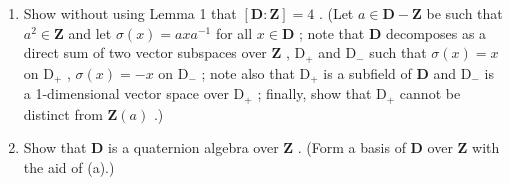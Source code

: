 \begin{enumerate}
\def\labelenumi{(\alph{enumi})}
\item
  Show without using Lemma 1 that \([\mathbf{D}:\mathbf{Z}] = 4\) . (Let \(a\in \mathbf{D} - \mathbf{Z}\) be such that \(a^2\in \mathbf{Z}\) and let \(\sigma (x) = axa^{-1}\) for all \(x\in \mathbf{D}\) ; note that \(\mathbf{D}\) decomposes as a direct sum of two vector subspaces over \(\mathbf{Z}\) , \(\mathrm{D}_{+}\) and \(\mathrm{D}_{-}\) such that \(\sigma (x) = x\) on \(\mathrm{D}_{+}\) , \(\sigma (x) = -x\) on \(\mathrm{D}_{-}\) ; note also that \(\mathrm{D}_{+}\) is a subfield of \(\mathbf{D}\) and \(\mathrm{D}_{-}\) is a 1-dimensional vector space over \(\mathrm{D}_{+}\) ; finally, show that \(\mathrm{D}_{+}\) cannot be distinct from \(\mathbf{Z}(a)\) .)
\item
  Show that \(\mathbf{D}\) is a quaternion algebra over \(\mathbf{Z}\) . (Form a basis of \(\mathbf{D}\) over \(\mathbf{Z}\) with the aid of (a).)
\end{enumerate}


